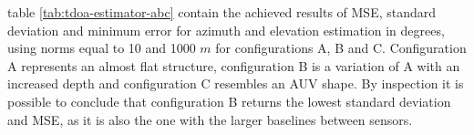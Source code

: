 
 table \ref{tab:tdoa-estimator-abc} contain the achieved results of MSE, standard deviation and minimum error for azimuth and elevation estimation in degrees, using norms equal to 10 and 1000 $m$ for configurations A, B and C. Configuration A represents an almost flat structure, configuration B is a variation of A with an increased depth and configuration C resembles an AUV shape. By inspection it is possible to conclude that configuration B returns the lowest standard deviation and MSE, as it is also the one with the larger baselines between sensors.

\begin{table}[!htbp] %
	\begin{center}
		\caption{Obtained errors for configurations A,B and C by GBE}
		\label{tab:tdoa-estimator-abc}
	\end{center}
\end{table}

